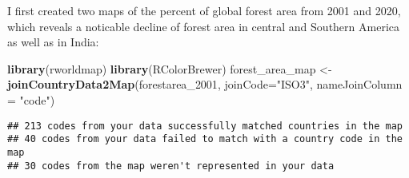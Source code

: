 \documentclass[
]{article}
\newenvironment{Shaded}{\begin{snugshade}}{\end{snugshade}}
\newcommand{\DataTypeTok}[1]{\textcolor[rgb]{0.13,0.29,0.53}{#1}}
\newcommand{\DecValTok}[1]{\textcolor[rgb]{0.00,0.00,0.81}{#1}}
\newcommand{\KeywordTok}[1]{\textcolor[rgb]{0.13,0.29,0.53}{\textbf{#1}}}
\newcommand{\NormalTok}[1]{#1}
\newcommand{\StringTok}[1]{\textcolor[rgb]{0.31,0.60,0.02}{#1}}
\begin{document}
I first created two maps of the percent of global forest area from 2001
and 2020, which reveals a noticable decline of forest area in central
and Southern America as well as in India:

\begin{Shaded}
\begin{Highlighting}[]
\KeywordTok{library}\NormalTok{(rworldmap)}
\KeywordTok{library}\NormalTok{(RColorBrewer)}
\NormalTok{forest\_area\_map \textless{}{-}}\StringTok{ }\KeywordTok{joinCountryData2Map}\NormalTok{(forestarea\_}\DecValTok{2001}\NormalTok{, }\DataTypeTok{joinCode=}\StringTok{"ISO3"}\NormalTok{, }\DataTypeTok{nameJoinColumn =} \StringTok{"code"}\NormalTok{)}
\end{Highlighting}
\end{Shaded}

\begin{verbatim}
## 213 codes from your data successfully matched countries in the map
## 40 codes from your data failed to match with a country code in the map
## 30 codes from the map weren't represented in your data
\end{verbatim}
\end{document}
